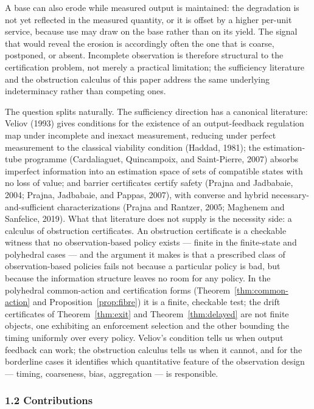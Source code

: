 \documentclass[10pt,twocolumn]{article}
\theoremstyle{definition}
\begin{document}
A base can also erode while measured output is maintained: the
degradation is not yet reflected in the measured quantity, or it is
offset by a higher per-unit service, because use may draw on the base
rather than on its yield. The signal that would reveal the erosion is
accordingly often the one that is coarse, postponed, or absent.
Incomplete observation is therefore structural to the certification
problem, not merely a practical limitation; the sufficiency literature
and the obstruction calculus of this paper address the same underlying
indeterminacy rather than competing ones.

The question splits naturally. The sufficiency direction has a canonical literature: Veliov (1993) gives conditions for the existence of an output-feedback regulation map under incomplete and inexact measurement, reducing under perfect measurement to the classical viability condition (Haddad, 1981); the estimation-tube programme (Cardaliaguet, Quincampoix, and Saint-Pierre, 2007) absorbs imperfect information into an estimation space of sets of compatible states with no loss of value; and barrier certificates certify safety (Prajna and Jadbabaie, 2004; Prajna, Jadbabaie, and Pappas, 2007), with converse and hybrid necessary-and-sufficient characterizations (Prajna and Rantzer, 2005; Maghenem and Sanfelice, 2019). What that literature does not supply is the necessity side: a calculus of obstruction certificates. An obstruction certificate is a checkable witness that no observation-based policy exists --- finite in the finite-state and polyhedral cases --- and the argument it makes is that a prescribed class of observation-based policies fails not because a particular policy is bad, but because the information structure leaves no room for any policy. In the polyhedral common-action and certification forms (Theorem~\ref{thm:common-action} and Proposition~\ref{prop:fibre}) it is a finite, checkable test; the drift certificates of Theorem~\ref{thm:exit} and Theorem~\ref{thm:delayed} are not finite objects, one exhibiting an enforcement selection and the other bounding the timing uniformly over every policy. Veliov's condition tells us when output feedback can work; the obstruction calculus tells us when it cannot, and for the borderline cases it identifies which quantitative feature of the observation design --- timing, coarseness, bias, aggregation --- is responsible.

\subsubsection{1.2 Contributions}\label{contributions}
\end{document}
